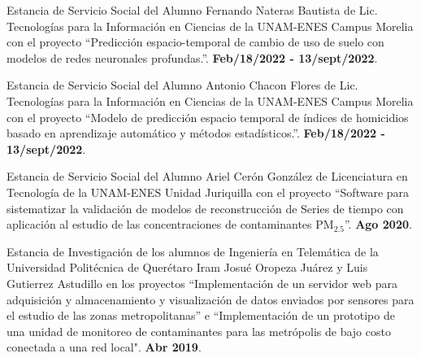 \documentclass[10pt]{article}
\newenvironment{innerlist}[1][\enskip\textbullet]%
        {\begin{compactitem}[#1]}{\end{compactitem}}
\begin{document}
\begin{innerlist}

\item Estancia de Servicio Social del Alumno Fernando Nateras Bautista de Lic. Tecnologías para la Información en Ciencias de la UNAM-ENES Campus Morelia con el proyecto ``Predicción espacio-temporal de cambio de uso de suelo con modelos de redes neuronales profundas.''. \textbf{Feb/18/2022 - 13/sept/2022}.

\item Estancia de Servicio Social del Alumno Antonio Chacon Flores de Lic. Tecnologías para la Información en Ciencias de la UNAM-ENES Campus Morelia con el proyecto ``Modelo de predicción espacio temporal de índices de homicidios basado en aprendizaje automático y métodos estadísticos.''. \textbf{Feb/18/2022 - 13/sept/2022}.

\item Estancia de Servicio Social del Alumno Ariel Cerón González de Licenciatura en Tecnología de la UNAM-ENES Unidad Juriquilla con el proyecto ``Software para sistematizar la validación de modelos de reconstrucción de Series de tiempo con aplicación al estudio de las concentraciones de contaminantes PM$_{2.5}$''. \textbf{Ago 2020}.

\item Estancia de Investigación de los alumnos de Ingeniería en Telemática de la Universidad Politécnica de Querétaro Iram Josué Oropeza Juárez y Luis Gutierrez Astudillo en los proyectos ``Implementación de un servidor web para adquisición y almacenamiento y visualización de datos enviados por sensores para el estudio de las zonas metropolitanas'' e ``Implementación de un prototipo de una unidad de monitoreo de contaminantes para las metrópolis de bajo costo conectada a una red local".  \textbf{Abr 2019}.


\end{innerlist}
\end{document}
